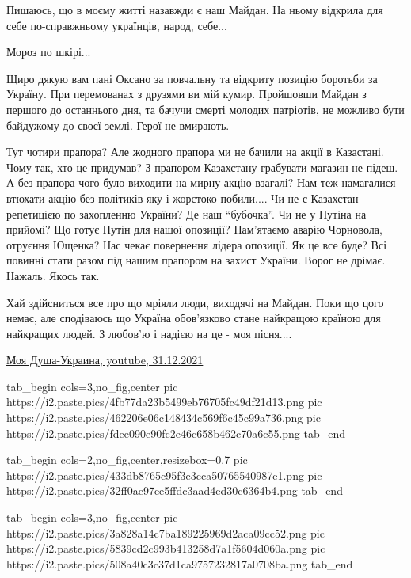 \begin{itemize}

Пишаюсь, що в моєму житті назавжди є наш Майдан. На ньому відкрила для себе
по-справжньому українців, народ, себе...


Мороз по шкірі...


Щиро дякую вам пані Оксано за повчальну та відкриту позицію боротьби за
Україну. При перемованах з друзями ви мій кумир. Пройшовши Майдан з першого до
останнього дня, та бачучи смерті молодих патріотів, не можливо бути байдужому
до своєї землі. Герої не вмирають.


Тут чотири прапора? Але жодного прапора ми не бачили на акції в Казастані. Чому
так, хто це придумав? З прапором Казахстану грабувати магазин не підеш. А без
прапора чого було виходити на мирну акцію взагалі? Нам теж намагалися втюхати
акцію без політиків яку і жорстоко побили.... Чи не є Казахстан репетицією по
захопленню України? Де наш \enquote{бубочка}. Чи не у Путіна на прийомі? Що готує Путін
для нашої опозиції? Пам'ятаємо аварію Чорновола, отруєння Ющенка? Нас чекає
повернення лідера опозиції. Як це все буде? Всі повинні стати разом під нашим
прапором на захист України. Ворог не дрімає. Нажаль. Якось так.


Хай здійсниться все про що мріяли люди, виходячі на Майдан. Поки що цого немає,
але сподіваюсь що Україна обов'язково стане найкращою країною для найкращих
людей. З любов'ю і надією на це - моя пісня....

\href{https://www.youtube.com/watch?v=0o7t5FHPYf8}{%
Моя Душа-Украина, youtube, 31.12.2021%
}


\ifcmt
  tab_begin cols=3,no_fig,center
     pic https://i2.paste.pics/4fb77da23b5499eb76705fc49df21d13.png
		 pic https://i2.paste.pics/462206e06c148434c569f6c45c99a736.png
		 pic https://i2.paste.pics/fdee090e90fc2e46c658b462c70a6c55.png
  tab_end
\fi

\ifcmt
  tab_begin cols=2,no_fig,center,resizebox=0.7
	  pic https://i2.paste.pics/433db8765c95f3e3cca50765540987e1.png
		pic https://i2.paste.pics/32ff0ae97ee5ffdc3aad4ed30c6364b4.png
  tab_end
\fi


\ifcmt
  tab_begin cols=3,no_fig,center
     pic https://i2.paste.pics/3a828a14c7ba189225969d2aca09cc52.png
		 pic https://i2.paste.pics/5839cd2c993b413258d7a1f5604d060a.png
		 pic https://i2.paste.pics/508a40c3c37d1ca9757232817a0708ba.png
  tab_end
\fi



\end{itemize}

